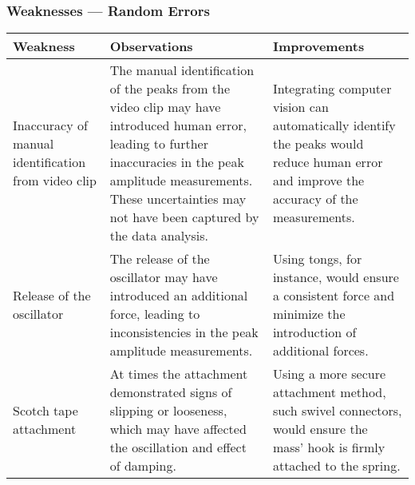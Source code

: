 \documentclass[a4paper,12pt]{article}
\newcommand{\thcolor}{\cellcolor{Blue!25}}
\begin{document}
\subsubsection{Weaknesses --- Random Errors}

\begin{center}
  \begin{tabular}{|p{}|p{}|p{}|}
    \hline
    \thcolor Weakness                                   & \thcolor Observations                                                                                                                                                                                                                & \thcolor Improvements                                                                                                                   \\ \hline
    Inaccuracy of manual identification from video clip & The manual identification of the peaks from the video clip may have introduced human error, leading to further inaccuracies in the peak amplitude measurements. These uncertainties may not have been captured by the data analysis. & Integrating computer vision can automatically identify the peaks would reduce human error and improve the accuracy of the measurements. \\ \hline
    Release of the oscillator                           & The release of the oscillator may have introduced an additional force, leading to inconsistencies in the peak amplitude measurements.                                                                                                & Using tongs, for instance, would ensure a consistent force and minimize the introduction of additional forces.                          \\ \hline
    Scotch tape attachment                              & At times the attachment demonstrated signs of slipping or looseness, which may have affected the oscillation and effect of damping.                                                                                                  & Using a more secure attachment method, such swivel connectors, would ensure the mass' hook is firmly attached to the spring.            \\ \hline
  \end{tabular}
\end{center}

\pagebreak
\end{document}
